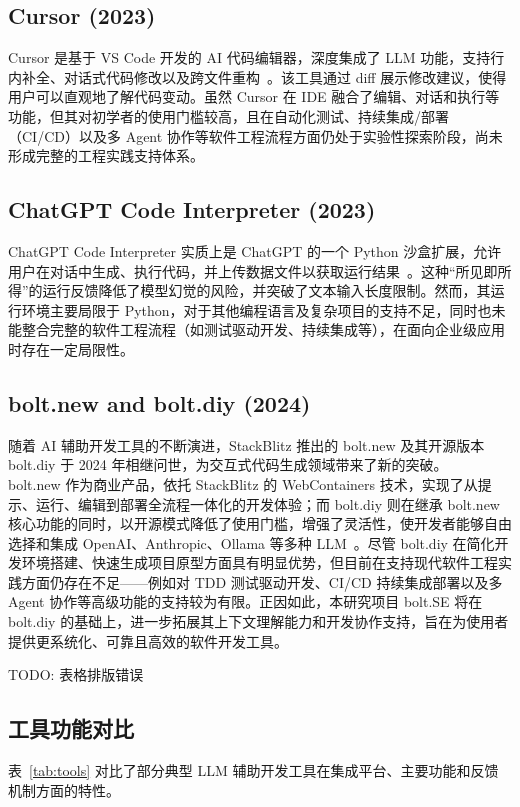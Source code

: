 \subsection{Cursor (2023)}
Cursor 是基于 VS Code 开发的 AI 代码编辑器，深度集成了 LLM 功能，支持行内补全、对话式代码修改以及跨文件重构~\cite{CursorReview}。该工具通过 diff 展示修改建议，使得用户可以直观地了解代码变动。虽然 Cursor 在 IDE 融合了编辑、对话和执行等功能，但其对初学者的使用门槛较高，且在自动化测试、持续集成/部署（CI/CD）以及多 Agent 协作等软件工程流程方面仍处于实验性探索阶段，尚未形成完整的工程实践支持体系。

\subsection{ChatGPT Code Interpreter (2023)}
ChatGPT Code Interpreter 实质上是 ChatGPT 的一个 Python 沙盒扩展，允许用户在对话中生成、执行代码，并上传数据文件以获取运行结果~\cite{FirstBlush2023}。这种“所见即所得”的运行反馈降低了模型幻觉的风险，并突破了文本输入长度限制。然而，其运行环境主要局限于 Python，对于其他编程语言及复杂项目的支持不足，同时也未能整合完整的软件工程流程（如测试驱动开发、持续集成等），在面向企业级应用时存在一定局限性。

\subsection{bolt.new and bolt.diy (2024)}
随着 AI 辅助开发工具的不断演进，StackBlitz 推出的 bolt.new 及其开源版本 bolt.diy 于 2024 年相继问世，为交互式代码生成领域带来了新的突破。\\

bolt.new 作为商业产品，依托 StackBlitz 的 WebContainers 技术，实现了从提示、运行、编辑到部署全流程一体化的开发体验；而 bolt.diy 则在继承 bolt.new 核心功能的同时，以开源模式降低了使用门槛，增强了灵活性，使开发者能够自由选择和集成 OpenAI、Anthropic、Ollama 等多种 LLM~\cite{BoltNew2024, BoltDIY2024}。尽管 bolt.diy 在简化开发环境搭建、快速生成项目原型方面具有明显优势，但目前在支持现代软件工程实践方面仍存在不足——例如对 TDD 测试驱动开发、CI/CD 持续集成部署以及多 Agent 协作等高级功能的支持较为有限。正因如此，本研究项目 bolt.SE 将在 bolt.diy 的基础上，进一步拓展其上下文理解能力和开发协作支持，旨在为使用者提供更系统化、可靠且高效的软件开发工具。

TODO: 表格排版错误
\subsection{工具功能对比}
表~\ref{tab:tools} 对比了部分典型 LLM 辅助开发工具在集成平台、主要功能和反馈机制方面的特性。

